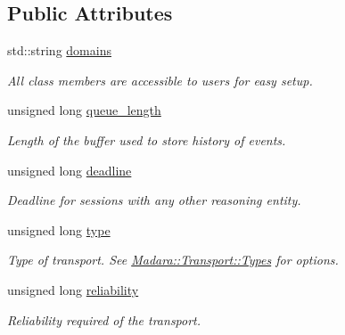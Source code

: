 \subsection*{Public Attributes}
\begin{DoxyCompactItemize}
\item 
std::string \hyperlink{classMadara_1_1Transport_1_1Settings_acc01f153d1de27dd9f1bf8e1469619a8}{domains}
\begin{DoxyCompactList}\small\item\em All class members are accessible to users for easy setup. \item\end{DoxyCompactList}\item 
unsigned long \hyperlink{classMadara_1_1Transport_1_1Settings_a254ee749bceeef8500f2c27a78b9c628}{queue\_\-length}
\begin{DoxyCompactList}\small\item\em Length of the buffer used to store history of events. \item\end{DoxyCompactList}\item 
unsigned long \hyperlink{classMadara_1_1Transport_1_1Settings_a2f971b9fb9c84bef42e03536542fbc11}{deadline}
\begin{DoxyCompactList}\small\item\em Deadline for sessions with any other reasoning entity. \item\end{DoxyCompactList}\item 
unsigned long \hyperlink{classMadara_1_1Transport_1_1Settings_aa2c6e7582dd1b3358fa754f3f5201e45}{type}
\begin{DoxyCompactList}\small\item\em Type of transport. See \hyperlink{namespaceMadara_1_1Transport_a280656de18d1bbe4a165cd9fdd654ba5}{Madara::Transport::Types} for options. \item\end{DoxyCompactList}\item 
unsigned long \hyperlink{classMadara_1_1Transport_1_1Settings_aacef2f9d64a4e8bec3e62a7ff539f217}{reliability}
\begin{DoxyCompactList}\small\item\em Reliability required of the transport. \item\end{DoxyCompactList}\end{DoxyCompactItemize}
